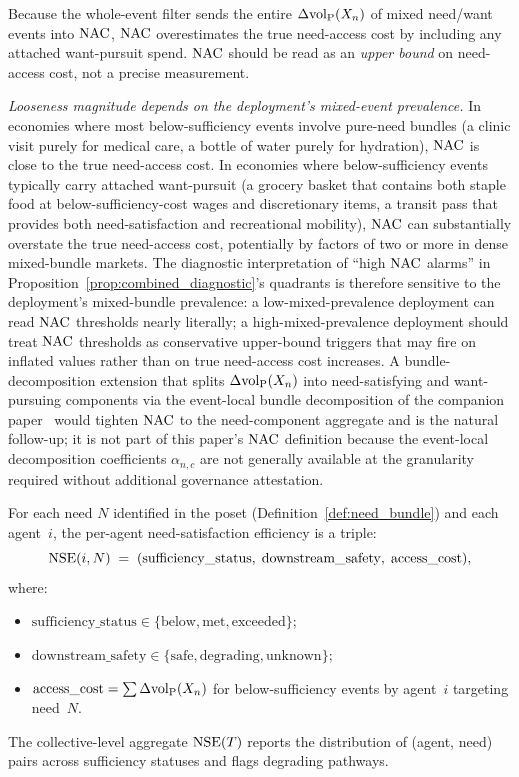 \begin{remark}
\label{rem:nac_upper_bound}
Because the whole-event filter sends the entire
$\Delta{\operatorname{vol}_{\mathrm{P}}}(X_n)$ of mixed need/want events into $\mathrm{NAC}$,
$\mathrm{NAC}$ overestimates the true need-access cost by including any
attached want-pursuit spend.  $\mathrm{NAC}$ should be read as an
\emph{upper bound} on need-access cost, not a precise
measurement.

\emph{Looseness magnitude depends on the deployment's mixed-event
prevalence.}  In economies where most below-sufficiency events
involve pure-need bundles (a clinic visit purely for medical care,
a bottle of water purely for hydration), $\mathrm{NAC}$ is close to the
true need-access cost.  In economies where below-sufficiency
events typically carry attached want-pursuit (a grocery basket
that contains both staple food at below-sufficiency-cost wages and
discretionary items, a transit pass that provides both
need-satisfaction and recreational mobility), $\mathrm{NAC}$ can
substantially overstate the true need-access cost, potentially
by factors of two or more in dense mixed-bundle markets.  The
diagnostic interpretation of ``high $\mathrm{NAC}$ alarms'' in
Proposition~\ref{prop:combined_diagnostic}'s quadrants is
therefore sensitive to the deployment's mixed-bundle prevalence:
a low-mixed-prevalence deployment can read $\mathrm{NAC}$ thresholds
nearly literally; a high-mixed-prevalence deployment should
treat $\mathrm{NAC}$ thresholds as conservative upper-bound triggers
that may fire on inflated values rather than on true
need-access cost increases.  A bundle-decomposition
extension that splits $\Delta{\operatorname{vol}_{\mathrm{P}}}(X_n)$ into need-satisfying
and want-pursuing components via the event-local bundle
decomposition of the companion
paper~\citep[Revealed~Sacrifice]{lasser2026paper8a} would tighten $\mathrm{NAC}$ to
the need-component aggregate and is the natural follow-up; it
is not part of this paper's $\mathrm{NAC}$ definition because the
event-local decomposition coefficients $\alpha_{n,c}$ are not
generally available at the granularity required without
additional governance attestation.
\end{remark}

\begin{definition}
\label{def:nse}
For each need $N$ identified in the poset
(Definition~\ref{def:need_bundle}) and each agent~$i$, the
per-agent need-satisfaction efficiency is a triple:
\[
  \mathrm{NSE}(i, N) \;=\; (\mathrm{sufficiency\_status},\;
  \mathrm{downstream\_safety},\; \mathrm{access\_cost}),
\]
where:
\begin{itemize}
\item $\mathrm{sufficiency\_status} \in
  \{\text{below}, \text{met}, \text{exceeded}\}$;
\item $\mathrm{downstream\_safety} \in
  \{\text{safe}, \text{degrading}, \text{unknown}\}$;
\item $\mathrm{access\_cost} = \sum \Delta{\operatorname{vol}_{\mathrm{P}}}(X_n)$ for
  below-sufficiency events by agent~$i$ targeting need~$N$.
\end{itemize}
The collective-level aggregate $\mathrm{NSE}(T)$ reports the distribution
of (agent, need) pairs across sufficiency statuses and flags
degrading pathways.
\end{definition}

